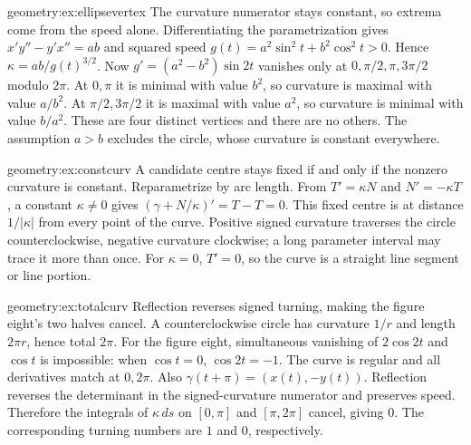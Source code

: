 \begin{solution}{geometry:ex:ellipsevertex}
\idea The curvature numerator stays constant, so extrema come from the speed alone.
\writeup Differentiating the parametrization gives $x'y''-y'x''=ab$ and squared speed $g(t)=a^2\sin^2t+b^2\cos^2t>0$. Hence $\kappa=ab/g(t)^{3/2}$. Now $g'=(a^2-b^2)\sin2t$ vanishes only at $0,\pi/2,\pi,3\pi/2$ modulo $2\pi$. At $0,\pi$ it is minimal with value $b^2$, so curvature is maximal with value $a/b^2$. At $\pi/2,3\pi/2$ it is maximal with value $a^2$, so curvature is minimal with value $b/a^2$. These are four distinct vertices and there are no others. The assumption $a>b$ excludes the circle, whose curvature is constant everywhere.
\end{solution}

\begin{solution}{geometry:ex:constcurv}
\idea A candidate centre stays fixed if and only if the nonzero curvature is constant.
\writeup Reparametrize by arc length. From $T'=\kappa N$ and $N'=-\kappa T$, a constant $\kappa\ne0$ gives
$(\gamma+N/\kappa)'=T-T=0$. This fixed centre is at distance $1/|\kappa|$ from every point of the curve. Positive signed curvature traverses the circle counterclockwise, negative curvature clockwise; a long parameter interval may trace it more than once. For $\kappa=0$, $T'=0$, so the curve is a straight line segment or line portion.
\end{solution}

\begin{solution}{geometry:ex:totalcurv}
\idea Reflection reverses signed turning, making the figure eight's two halves cancel.
\writeup A counterclockwise circle has curvature $1/r$ and length $2\pi r$, hence total $2\pi$. For the figure eight, simultaneous vanishing of $2\cos2t$ and $\cos t$ is impossible: when $\cos t=0$, $\cos2t=-1$. The curve is regular and all derivatives match at $0,2\pi$. Also $\gamma(t+\pi)=(x(t),-y(t))$. Reflection reverses the determinant in the signed-curvature numerator and preserves speed. Therefore the integrals of $\kappa\,ds$ on $[0,\pi]$ and $[\pi,2\pi]$ cancel, giving $0$. The corresponding turning numbers are $1$ and $0$, respectively.
\end{solution}

